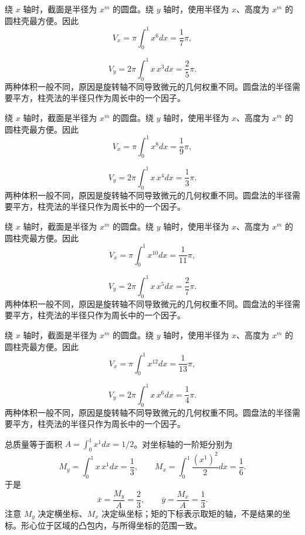 \documentclass[12pt,fontset=fandol]{ctexart}
\begin{document}
\begin{solve}\label{ans:c21q9}
绕 $x$ 轴时，截面是半径为 $x^m$ 的圆盘。绕 $y$ 轴时，使用半径为 $x$、高度为 $x^m$ 的圆柱壳最方便。因此
\[
V_x=\pi\int_0^1x^{6}dx=\frac{1}{7}\pi,
\]

\[
V_y=2\pi\int_0^1x\,x^{3}dx=\frac{2}{5}\pi.
\]
两种体积一般不同，原因是旋转轴不同导致微元的几何权重不同。圆盘法的半径需要平方，柱壳法的半径只作为周长中的一个因子。
\end{solve}

\begin{solve}\label{ans:c21q10}
绕 $x$ 轴时，截面是半径为 $x^m$ 的圆盘。绕 $y$ 轴时，使用半径为 $x$、高度为 $x^m$ 的圆柱壳最方便。因此
\[
V_x=\pi\int_0^1x^{8}dx=\frac{1}{9}\pi,
\]

\[
V_y=2\pi\int_0^1x\,x^{4}dx=\frac{1}{3}\pi.
\]
两种体积一般不同，原因是旋转轴不同导致微元的几何权重不同。圆盘法的半径需要平方，柱壳法的半径只作为周长中的一个因子。
\end{solve}

\begin{solve}\label{ans:c21q11}
绕 $x$ 轴时，截面是半径为 $x^m$ 的圆盘。绕 $y$ 轴时，使用半径为 $x$、高度为 $x^m$ 的圆柱壳最方便。因此
\[
V_x=\pi\int_0^1x^{10}dx=\frac{1}{11}\pi,
\]

\[
V_y=2\pi\int_0^1x\,x^{5}dx=\frac{2}{7}\pi.
\]
两种体积一般不同，原因是旋转轴不同导致微元的几何权重不同。圆盘法的半径需要平方，柱壳法的半径只作为周长中的一个因子。
\end{solve}

\begin{solve}\label{ans:c21q12}
绕 $x$ 轴时，截面是半径为 $x^m$ 的圆盘。绕 $y$ 轴时，使用半径为 $x$、高度为 $x^m$ 的圆柱壳最方便。因此
\[
V_x=\pi\int_0^1x^{12}dx=\frac{1}{13}\pi,
\]

\[
V_y=2\pi\int_0^1x\,x^{6}dx=\frac{1}{4}\pi.
\]
两种体积一般不同，原因是旋转轴不同导致微元的几何权重不同。圆盘法的半径需要平方，柱壳法的半径只作为周长中的一个因子。
\end{solve}

\begin{solve}\label{ans:c21q13}
总质量等于面积 $A=\int_0^1x^{1}dx=1/2$。对坐标轴的一阶矩分别为
\[
M_y=\int_0^1x\,x^{1}dx=\frac1{3},\qquad M_x=\int_0^1\frac{(x^{1})^2}2dx=\frac1{6}.
\]
于是
\[
\bar x=\frac{M_y}A=\frac{2}{3},\qquad\bar y=\frac{M_x}A=\frac{1}{3}.
\]
注意 $M_y$ 决定横坐标、$M_x$ 决定纵坐标；矩的下标表示取矩的轴，不是结果的坐标。形心位于区域的凸包内，与所得坐标的范围一致。
\end{solve}
\end{document}
